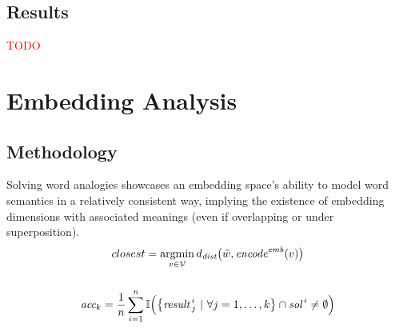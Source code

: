 \documentclass[aspectratio=169, 12pt]{beamer}
\begin{document}
    \subsection{Results}
    \begin{frame}{}
        \textcolor{red}{TODO}
    \end{frame}

    \section{Embedding Analysis}

    \subsection{Methodology}
    \begin{frame}{}
        Solving word analogies showcases an embedding space's ability to model word semantics in a relatively consistent way, implying the existence of embedding dimensions with associated meanings (even if overlapping or under superposition).
        \begin{equation*}
            \begin{gathered}
                closest = \operatornamewithlimits{argmin}_{v \in \mathcal{V}} d_{\textit{dist}}\bigl(\tilde w, \textit{encode}^{\textit{emb}}(v)\bigr) \\[15pt]
                \textit{acc}_k = \frac{1}{n} \sum_{i=1}^{n} \mathbb{I}\Bigl( {\left\{ {\textit{result}\,}^i_j \ |\ \forall j = 1,\ldots,k \right\}} \cap {\textit{sol}\,}^i \neq \emptyset \Bigr)
            \end{gathered}
        \end{equation*}
    \end{frame}
\end{document}
